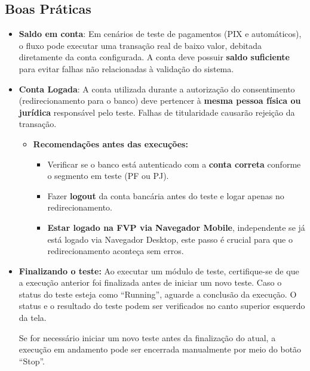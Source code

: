 \subsection{Boas Práticas}
\begin{itemize}
    \item \textbf{Saldo em conta}: Em cenários de teste de pagamentos (PIX e automáticos), o fluxo pode executar uma transação real de baixo valor, debitada diretamente da conta configurada. A conta deve possuir \textbf{saldo suficiente} para evitar falhas não relacionadas à validação do sistema.
    
    \item \textbf{Conta Logada}: A conta utilizada durante a autorização do consentimento (redirecionamento para o banco) deve pertencer à \textbf{mesma pessoa física ou jurídica} responsável pelo teste. Falhas de titularidade causarão rejeição da transação.
    
    \begin{itemize}
        \item\textbf{Recomendações antes das execuções:}
        \begin{itemize}
            \item Verificar se o banco está autenticado com a \textbf{conta correta} conforme o segmento em teste (PF ou PJ).
            \item Fazer \textbf{logout} da conta bancária antes do teste e logar apenas no redirecionamento.
            \item \textbf{Estar logado na FVP via Navegador Mobile}, independente se já está logado via Navegador Desktop, este passo é crucial para que o redirecionamento aconteça sem erros.
        \end{itemize}
    \end{itemize}
    \item \textbf{Finalizando o teste:} Ao executar um módulo de teste, certifique-se de que a execução anterior foi finalizada antes de iniciar um novo teste. Caso o status do teste esteja como “Running”, aguarde a conclusão da execução.
    O status e o resultado do teste podem ser verificados no canto superior esquerdo da tela.
    \begin{figure}[H]
    \centering
    \label{fig:imagem1}
    \end{figure}

    Se for necessário iniciar um novo teste antes da finalização do atual, a execução em andamento pode ser encerrada manualmente por meio do botão “Stop”.
    \begin{figure}[H]
    \centering
    \label{fig:buttonstop}
    \end{figure}
\end{itemize}

